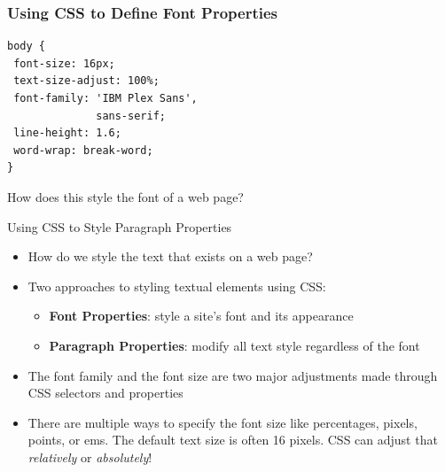 \documentclass[14pt,aspectratio=169]{beamer}
\begin{document}
%
\begin{frame}[fragile]
  \frametitle{Using CSS to Define Font Properties}
  \normalsize
  \hspace*{.25in}
  \begin{minipage}{6in}
    \vspace*{.15in}
    \begin{verbatim}
body {
 font-size: 16px;
 text-size-adjust: 100%;
 font-family: 'IBM Plex Sans',
              sans-serif;
 line-height: 1.6;
 word-wrap: break-word;
}
    \end{verbatim}
  \end{minipage}
  \vspace*{-.05in}
  \begin{center}
    \noindent How does this style the font of a web page? \\
  \end{center}
\end{frame}


%
\begin{frame}{Using CSS to Style Paragraph Properties}
  \begin{itemize}
    \item How do we style the text that exists on a web page?
      \vspace*{-.2in}
    \item Two approaches to styling textual elements using CSS:
      \begin{itemize}
        \item {\bf Font Properties}: style a site's font and its appearance
        \item {\bf Paragraph Properties}: modify all text style regardless of
          the font
      \end{itemize}
      \vspace*{-.2in}
    \item The font family and the font size are two major adjustments made
      through CSS selectors and properties
      \vspace*{-.2in}
    \item There are multiple ways to specify the font size like percentages,
      pixels, points, or ems. The default text size is often 16 pixels. CSS can
      adjust that {\em relatively} or {\em absolutely}!
  \end{itemize}
\end{frame}
\end{document}
